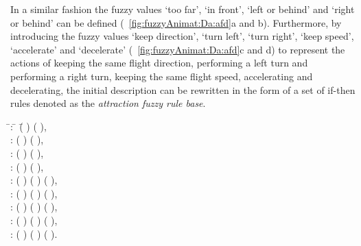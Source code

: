 In a similar fashion the fuzzy values `too far', `in front', `left or behind' and `right or behind' can be defined (\figs~\ref{fig:fuzzyAnimat:Da:afd}a and b). Furthermore, by introducing the fuzzy values `keep direction', `turn left', `turn right', `keep speed', `accelerate' and `decelerate' (\figs~\ref{fig:fuzzyAnimat:Da:afd}c and d) to represent the actions of keeping the same flight direction, performing a left turn and performing a right turn, keeping the same flight speed, accelerating and decelerating, the initial description can be rewritten in the form of a set of if-then rules denoted as the \emph{attraction fuzzy rule base}.

{\footnotesize
\begin{tabbing}
\quad \= : \quad \=  \=(  )  (  ), \\
\> : \>  (  )  (  ), \\
\> : \>  (  )  (  ), \\
\> : \>  (  )  (  ), \\
\> : \>  (  )  (  )  (  ), \\
\> : \>  (  )  (  )  (  ), \\
\> : \>  (  )  (  )  (  ), \\
\> : \>  (  )  (  )  (  ), \\
\> : \>  (  )  (  )  (  ).
\end{tabbing}
}

